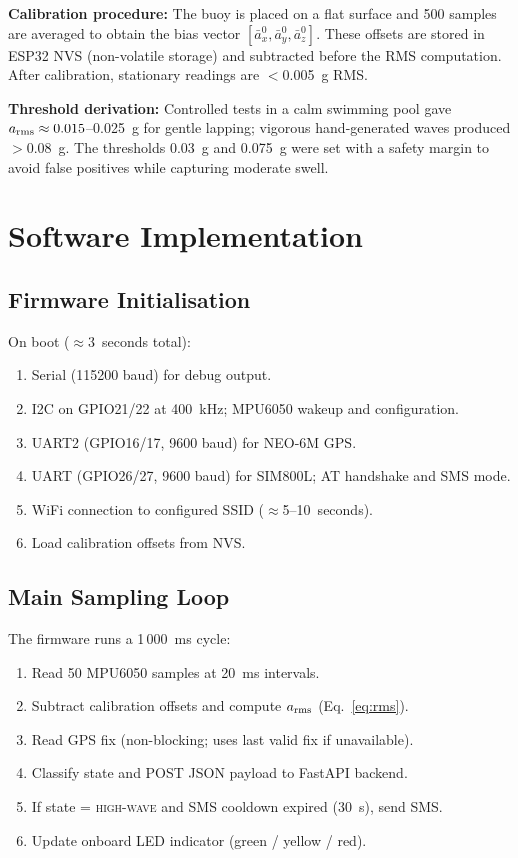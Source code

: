 \textbf{Calibration procedure:} The buoy is placed on a flat surface and 500 samples
are averaged to obtain the bias vector $[\bar{a}_x^0, \bar{a}_y^0, \bar{a}_z^0]$.
These offsets are stored in ESP32 NVS (non-volatile storage) and subtracted before the
RMS computation. After calibration, stationary readings are $<$0.005~g RMS.

\textbf{Threshold derivation:} Controlled tests in a calm swimming pool gave
$a_{\rm rms} \approx 0.015$--0.025~g for gentle lapping; vigorous hand-generated
waves produced $>$0.08~g. The thresholds 0.03~g and 0.075~g were set with a safety
margin to avoid false positives while capturing moderate swell.

\section{Software Implementation}

\subsection{Firmware Initialisation}

On boot ($\approx$3~seconds total):
\begin{enumerate}
  \item Serial (115200 baud) for debug output.
  \item I2C on GPIO21/22 at 400~kHz; MPU6050 wakeup and configuration.
  \item UART2 (GPIO16/17, 9600 baud) for NEO-6M GPS.
  \item UART (GPIO26/27, 9600 baud) for SIM800L; AT handshake and SMS mode.
  \item WiFi connection to configured SSID ($\approx$5--10~seconds).
  \item Load calibration offsets from NVS.
\end{enumerate}

\subsection{Main Sampling Loop}

The firmware runs a 1\,000~ms cycle:
\begin{enumerate}
  \item Read 50 MPU6050 samples at 20~ms intervals.
  \item Subtract calibration offsets and compute $a_{\rm rms}$ (Eq.~\ref{eq:rms}).
  \item Read GPS fix (non-blocking; uses last valid fix if unavailable).
  \item Classify state and POST JSON payload to FastAPI backend.
  \item If state = \textsc{high-wave} and SMS cooldown expired (30~s), send SMS.
  \item Update onboard LED indicator (green / yellow / red).
\end{enumerate}

